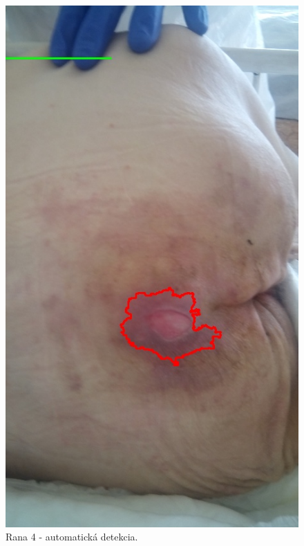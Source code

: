 \begin{figure}[h]
\begin{minipage}{0.48\textwidth}
     \includegraphics[scale=0.35]{fig/4a.jpeg}
      \caption{Rana 4 - automatická detekcia.}
      \label{fig:w4d}
   \end{minipage}
   \break \break \break
   \begin{minipage}{0.48\textwidth}
     \centering

\end{minipage}
\end{figure}
